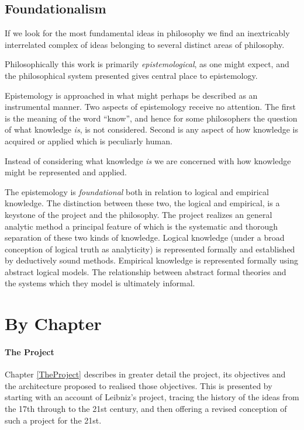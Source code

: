 \subsection{Foundationalism}

If we look for the most fundamental ideas in philosophy we find an
inextricably interrelated complex of ideas belonging to several
distinct areas of philosophy.

Philosophically this work is primarily {\it epistemological}, as one
might expect, and the philosophical system presented gives central
place to epistemology. 

Epistemology is approached in what might perhaps be described as an
instrumental manner.
Two aspects of epistemology receive no attention.
The first is the meaning of the word ``know'', and hence for some
philosophers the question of what knowledge {\it is}, is not
considered.
Second is any aspect of how knowledge is acquired or applied which is
peculiarly human.

Instead of considering what knowledge {\it is} we are concerned with
how knowledge might be represented and applied.

The epistemology is {\it foundational} both in relation to logical
and empirical knowledge.
The distinction between these two, the logical and empirical, is a
keystone of the project and the philosophy.
The project realizes an general analytic method a principal feature of
which is the systematic and thorough separation of these two kinds of
knowledge.
Logical knowledge (under a broad conception of logical truth as
analyticity) is represented formally and established by deductively
sound methods.
Empirical knowledge is represented formally using abstract logical
models.
The relationship between abstract formal theories and the systems
which they model is ultimately informal.

\section{By Chapter}

\paragraph{The Project}

Chapter \ref{TheProject} describes in greater detail the project,
its objectives and the architecture proposed to realised those objectives.
This is presented by starting with an account of Leibniz's project,
tracing the history of the ideas from the 17th through to the
21st century, and then offering a revised conception of such a
project for the 21st.

